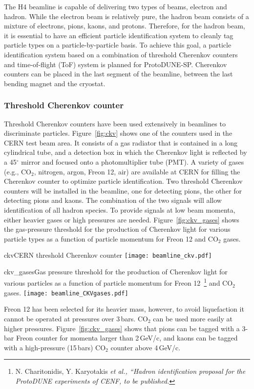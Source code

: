 The H4 beamline is capable of delivering two types of beams, electron and hadron. %
While the electron beam is relatively pure, the hadron beam consists of a mixture of electrons, pions, kaons, and protons. Therefore, for the hadron beam, it is essential to have an efficient particle identification system to cleanly tag particle types on a particle-by-particle basis. To achieve this goal, a particle identification system based on a combination of threshold Cherenkov counters and time-of-flight (ToF) system is planned for ProtoDUNE-SP. 
Cherenkov counters can be placed in the last segment of the beamline, between the last bending magnet and the cryostat. 

\subsubsection{Threshold Cherenkov counter}
Threshold Cherenkov counters have been used extensively in beamlines to discriminate particles. Figure~\ref{fig:ckv} shows one of the counters used in the CERN test beam area. It consists of a gas radiator that is contained in a long cylindrical tube, and a detection box in which the Cherenkov light is reflected by a 45$^\circ$ mirror and focused onto a photomultiplier tube (PMT). 
A variety of gases (e.g., CO$_2$, nitrogen, argon, Freon 12, air) are available at CERN for filling the Cherenkov counter to optimize particle identification. 
Two threshold Cherenkov counters will be installed in the beamline, one for detecting pions, the other for detecting pions 
and kaons. The combination of the two signals will allow identification of all hadron species. To provide signals at low beam momenta, either heavier gases or high pressures are needed.
Figure~\ref{fig:ckv_gases} shows the gas-pressure threshold 
for the production of Cherenkov light for various particle types as a function of particle momentum for Freon 12 and CO$_2$ gases.
\begin{cdrfigure}{ckv}{CERN threshold Cherenkov counter}
  \texttt{[image: beamline\_ckv.pdf]}
\end{cdrfigure}
\begin{cdrfigure}{ckv_gases}{Gas pressure threshold for the production of Cherenkov light for various particles as a function of particle momentum for Freon 12~\footnote{N. Charitonidis, Y. Karyotakis \it{et al.}, ``Hadron identification proposal for the ProtoDUNE experiments of CENF, to be published.} and CO$_2$ gases.}
  \texttt{[image: beamline\_CKVgases.pdf]}
\end{cdrfigure}
Freon 12 has been selected for its heavier mass, however,  to avoid liquefaction it cannot be operated at pressures over 3\,bars.  CO$_2$ can be used more easily at higher pressures.  
 Figure~\ref{fig:ckv_gases} shows that pions can be tagged with a 3-bar Freon counter for momenta larger than 2\,GeV/c, and kaons can be tagged with a high-pressure  (15\,bars) CO$_2$  counter above 4\,GeV/c.

